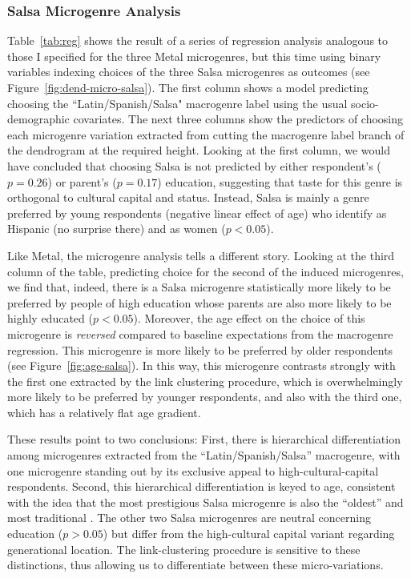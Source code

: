 \documentclass[a4paper,12pt]{extarticle}
\begin{document}
\subsubsection{Salsa Microgenre Analysis}
Table~\ref{tab:reg} shows the result of a series of regression analysis analogous to those I specified for the three Metal microgenres, but this time using binary variables indexing choices of the three Salsa microgenres as outcomes (see Figure~\ref{fig:dend-micro-salsa}). The first column shows a model predicting choosing the ``Latin/Spanish/Salsa" macrogenre label using the usual socio-demographic covariates. The next three columns show the predictors of choosing each microgenre variation extracted from cutting the macrogenre label branch of the dendrogram at the required height. Looking at the first column, we would have concluded that choosing Salsa is not predicted by either respondent's ($p = 0.26$) or parent's ($p = 0.17$) education, suggesting that taste for this genre is orthogonal to cultural capital and status. Instead, Salsa is mainly a genre preferred by young respondents (negative linear effect of age) who identify as Hispanic (no surprise there) and as women ($p < 0.05$). 

Like Metal, the microgenre analysis tells a different story. Looking at the third column of the table, predicting choice for the second of the induced microgenres, we find that, indeed, there is a Salsa microgenre statistically more likely to be preferred by people of high education whose parents are also more likely to be highly educated ($p < 0.05$). Moreover, the age effect on the choice of this microgenre is \textit{reversed} compared to baseline expectations from the macrogenre regression. This microgenre is more likely to be preferred by older respondents (see Figure~\ref{fig:age-salsa}). In this way, this microgenre contrasts strongly with the first one extracted by the link clustering procedure, which is overwhelmingly more likely to be preferred by younger respondents, and also with the third one, which has a relatively flat age gradient. 

These results point to two conclusions: First, there is hierarchical differentiation among microgenres extracted from the ``Latin/Spanish/Salsa'' macrogenre, with one microgenre standing out by its exclusive appeal to high-cultural-capital respondents. Second, this hierarchical differentiation is keyed to age, consistent with the idea that the most prestigious Salsa microgenre is also the ``oldest'' and most traditional \citep{Bachmayer2014-pk}. The other two Salsa microgenres are neutral concerning education ($p > 0.05$) but differ from the high-cultural capital variant regarding generational location. The link-clustering procedure is sensitive to these distinctions, thus allowing us to differentiate between these micro-variations.
\end{document}
